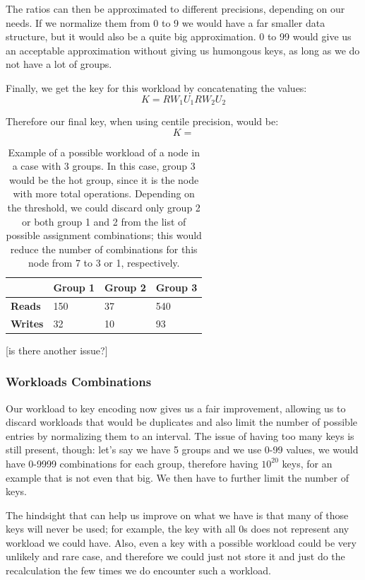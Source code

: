 The ratios can then be approximated to different precisions, depending on our needs. If we normalize them from 0 to 9 we would have a far smaller data structure, but it would also be a quite big approximation. 0 to 99 would give us an acceptable approximation without giving us humongous keys, as long as we do not have a lot of groups. 

Finally, we get the key for this workload by concatenating the values:
$$ K = RW_1 U_1 RW_2 U_2 $$

Therefore our final key, when using centile precision, would be:
$$ K = $$

\begin{table}[!htb]
  \centering
  \begin{tabular}{l l l l}
    \hline
    & \textbf{Group 1} & \textbf{Group 2} & \textbf{Group 3} \\
    \hline
    \textbf{Reads} & 150 & 37 & 540 \\
    \textbf{Writes} & 32 & 10 & 93 \\
    \hline
  \end{tabular}
  \caption{Example of a possible workload of a node in a case with 3 groups. In this case, group 3 would be the hot group, since it is the node with more total operations. Depending on the threshold, we could discard only group 2 or both group 1 and 2 from the list of possible assignment combinations; this would reduce the number of combinations for this node from 7 to 3 or 1, respectively.}\label{tab:workload-example}
\end{table}


[is there another issue?]

\subsubsection{Workloads Combinations}\label{sec:Workloads-combinations}
Our workload to key encoding now gives us a fair improvement, allowing us to discard workloads that would be duplicates and also limit the number of possible entries by normalizing them to an interval. The issue of having too many keys is still present, though: let's say we have 5 groups and we use 0-99 values, we would have 0-9999 combinations for each group, therefore having $10^{20}$ keys, for an example that is not even that big. We then have to further limit the number of keys. 

The hindsight that can help us improve on what we have is that many of those keys will never be used; for example, the key with all 0s does not represent any workload we could have. Also, even a key with a possible workload could be very unlikely and rare case, and therefore we could just not store it and just do the recalculation the few times we do encounter such a workload. 

